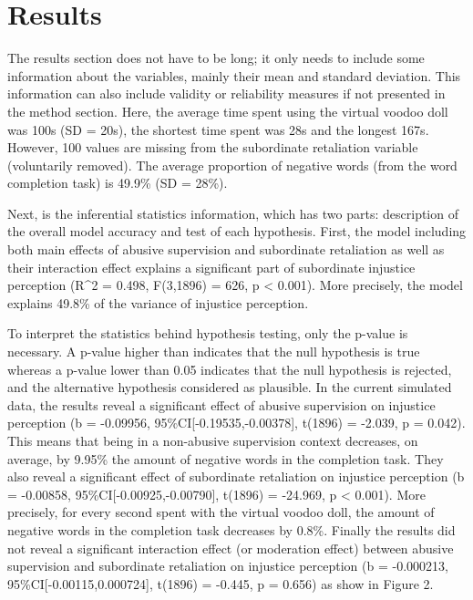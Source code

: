 \documentclass[
]{article}
\begin{document}
\hypertarget{results}{%
\section{Results}\label{results}}

The results section does not have to be long; it only needs to include
some information about the variables, mainly their mean and standard
deviation. This information can also include validity or reliability
measures if not presented in the method section. Here, the average time
spent using the virtual voodoo doll was 100s (SD = 20s), the shortest
time spent was 28s and the longest 167s. However, 100 values are missing
from the subordinate retaliation variable (voluntarily removed). The
average proportion of negative words (from the word completion task) is
49.9\% (SD = 28\%).

Next, is the inferential statistics information, which has two parts:
description of the overall model accuracy and test of each hypothesis.
First, the model including both main effects of abusive supervision and
subordinate retaliation as well as their interaction effect explains a
significant part of subordinate injustice perception (R\^{}2 = 0.498,
F(3,1896) = 626, p \textless{} 0.001). More precisely, the model
explains 49.8\% of the variance of injustice perception.

To interpret the statistics behind hypothesis testing, only the p-value
is necessary. A p-value higher than indicates that the null hypothesis
is true whereas a p-value lower than 0.05 indicates that the null
hypothesis is rejected, and the alternative hypothesis considered as
plausible. In the current simulated data, the results reveal a
significant effect of abusive supervision on injustice perception (b =
-0.09956, 95\%CI{[}-0.19535,-0.00378{]}, t(1896) = -2.039, p = 0.042).
This means that being in a non-abusive supervision context decreases, on
average, by 9.95\% the amount of negative words in the completion task.
They also reveal a significant effect of subordinate retaliation on
injustice perception (b = -0.00858, 95\%CI{[}-0.00925,-0.00790{]},
t(1896) = -24.969, p \textless{} 0.001). More precisely, for every
second spent with the virtual voodoo doll, the amount of negative words
in the completion task decreases by 0.8\%. Finally the results did not
reveal a significant interaction effect (or moderation effect) between
abusive supervision and subordinate retaliation on injustice perception
(b = -0.000213, 95\%CI{[}-0.00115,0.000724{]}, t(1896) = -0.445, p =
0.656) as show in Figure 2.
\end{document}
